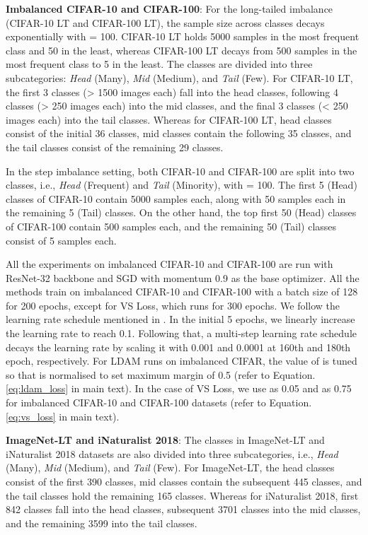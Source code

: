 \documentclass{article}
\begin{document}
\textbf{Imbalanced CIFAR-10 and CIFAR-100}:
For the long-tailed imbalance (CIFAR-10 LT and CIFAR-100 LT), the sample size across classes decays exponentially with  = 100. CIFAR-10 LT holds 5000 samples in the most frequent class and 50 in the least, whereas CIFAR-100 LT decays from 500 samples in the most frequent class to 5 in the least. The classes are divided into three subcategories: \textit{Head }(Many),\textit{ Mid} (Medium), and \textit{Tail} (Few). For CIFAR-10 LT, the first 3 classes (> 1500 images each) fall into the head classes, following 4 classes (> 250 images each) into the mid classes, and the final 3 classes (< 250 images each) into the tail classes. Whereas for CIFAR-100 LT, head classes consist of the initial 36 classes, mid classes contain the following 35 classes, and the tail classes consist of the remaining 29 classes.

In the step imbalance setting, both CIFAR-10 and CIFAR-100 are split into two classes, i.e., \textit{Head} (Frequent) and \textit{Tail} (Minority), with  = 100. The first 5 (Head) classes of CIFAR-10 contain 5000 samples each, along with 50 samples each in the remaining 5 (Tail) classes. On the other hand, the top first 50 (Head) classes of CIFAR-100 contain 500 samples each, and the remaining 50 (Tail) classes consist of 5 samples each. 

All the experiments on imbalanced CIFAR-10 and CIFAR-100 are run with ResNet-32 backbone and SGD with momentum 0.9 as the base optimizer. All the methods train on imbalanced CIFAR-10 and CIFAR-100 with a batch size of 128 for 200 epochs, except for VS Loss, which runs for 300 epochs. We follow the learning rate schedule mentioned in \citet{cao2019learning}. In the initial 5 epochs, we linearly increase the learning rate to reach 0.1. Following that, a multi-step learning rate schedule decays the learning rate by scaling it with 0.001 and 0.0001 at 160th and 180th epoch, respectively. For LDAM runs on imbalanced CIFAR, the value of  is tuned so that  is normalised to set maximum margin of 0.5 (refer to Equation. \ref{eq:ldam_loss} in main text). In the case of VS Loss, we use  as 0.05 and  as 0.75 for imbalanced CIFAR-10 and CIFAR-100 datasets (refer to Equation. \ref{eq:vs_loss} in main text).

\vspace{1mm}\noindent \textbf{ImageNet-LT and iNaturalist 2018}:
The classes in ImageNet-LT and iNaturalist 2018 datasets are also divided into three subcategories, i.e., \textit{Head }(Many),\textit{ Mid} (Medium), and \textit{Tail} (Few). For ImageNet-LT, the head classes consist of the first 390 classes, mid classes contain the subsequent 445 classes, and the tail classes hold the remaining 165 classes. Whereas for iNaturalist 2018, first 842 classes fall into the head classes, subsequent 3701 classes into the mid classes, and the remaining 3599 into the tail classes. 
\end{document}
